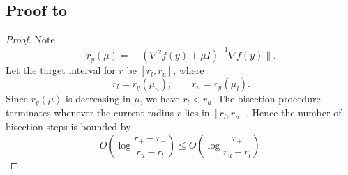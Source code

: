 \documentclass{article}
\numberwithin{equation}{section}
\numberwithin{equation}{section}
\begin{document}
\subsection*{Proof to }
\begin{proof}
    Note
    \[
        r_y(\mu)
        =
        \|(\nabla^2 f(y)+\mu I)^{-1}\nabla f(y)\|.
    \]
    Let the target interval for \(r\) be \([r_l,r_u]\), where
    \[
        r_l=r_y(\mu_u),
        \qquad
        r_u=r_y(\mu_l).
    \]
    Since \(r_y(\mu)\) is decreasing in \(\mu\), we have \(r_l<r_u\). The
    bisection procedure terminates whenever the current radius \(r\) lies in
    \([r_l,r_u]\). Hence the number of bisection steps is bounded by
    \begin{equation}
        \label{eq.rb-complexity-basic}
        O\left(
        \log\frac{r_+-r_-}{r_u-r_l}
        \right)
        \le
        O\left(
        \log\frac{r_+}{r_u-r_l}
        \right).
    \end{equation}


\end{proof}
\end{document}
